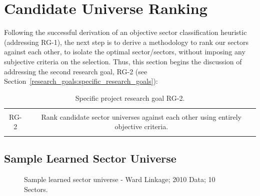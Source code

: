 \documentclass[../main.tex]{subfiles}
\begin{document}
    
\chapter{Candidate Universe Ranking}
    
Following the successful derivation of an objective sector classification heuristic (addressing RG-1), the next step is to derive a methodology to rank our sectors against each other, to isolate the optimal sector/sectors, without imposing any subjective criteria on the selection. Thus, this section begins the discussion of addressing the second research goal, RG-2 (see Section~\ref{research_goals:specific_research_goals}):

\begin{table}[h!]
    \centering
    \begin{tabular}{| c | c |}
        \hline
        &  \\
        RG-2 & Rank candidate sector universes against each other using entirely objective criteria. \\
        & \\
        \hline
    \end{tabular}
    \caption{Specific project research goal RG-2.}
    \label{table:candidate_universe_ranking:research_goal}
\end{table}

\section{Sample Learned Sector Universe}

\begin{figure}
    \centering
    \vspace{\wrapfigadjustment}
    \caption{Sample learned sector universe - Ward Linkage; 2010 Data; 10 Sectors.}
    \label{fig:candidate_universe_ranking:sample_ls_universe}
\end{figure}
\end{document}
